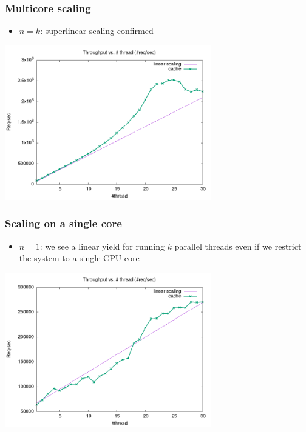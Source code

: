 \documentclass[11pt]{article}
\begin{document}
\subsubsection{Multicore scaling}
\label{sec:org9a71096}
\begin{itemize}
\item \(n=k\): superlinear scaling confirmed
\end{itemize}

\begin{center}
\includegraphics[width=9cm]{cache-no-cpu-bound.png}
\end{center}

\subsubsection{Scaling on a single core}
\label{sec:orgb79cc1d}
\begin{itemize}
\item \(n=1\): we see a linear yield for running \(k\) parallel threads even if we restrict the system to a
single CPU core
\end{itemize}

\begin{center}
\includegraphics[width=9cm]{cache-cpu-bound-150.png}
\end{center}
\end{document}
